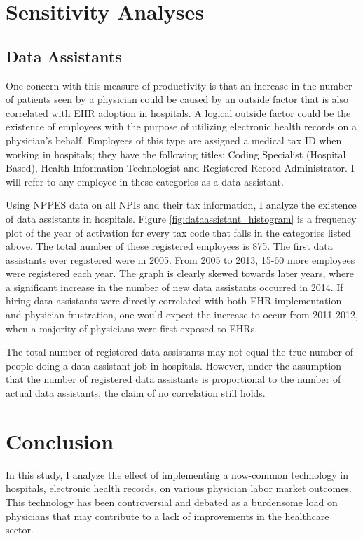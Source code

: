 \documentclass[11pt]{article}
\begin{document}
\section{Sensitivity Analyses}

\subsection{Data Assistants}

One concern with this measure of productivity is that an increase in the number of patients seen by a physician could be caused by an outside factor that is also correlated with EHR adoption in hospitals. A logical outside factor could be the existence of employees with the purpose of utilizing electronic health records on a physician's behalf. Employees of this type are assigned a medical tax ID when working in hospitals; they have the following titles: Coding Specialist (Hospital Based), Health Information Technologist and Registered Record Administrator. I will refer to any employee in these categories as a data assistant. 

Using NPPES data on all NPIs and their tax information, I analyze the existence of data assistants in hospitals. Figure \ref{fig:dataassistant_histogram} is a frequency plot of the year of activation for every tax code that falls in the categories listed above. The total number of these registered employees is 875. The first data assistants ever registered were in 2005. From 2005 to 2013, 15-60 more employees were registered each year. The graph is clearly skewed towards later years, where a significant increase in the number of new data assistants occurred in 2014. If hiring data assistants were directly correlated with both EHR implementation and physician frustration, one would expect the increase to occur from 2011-2012, when a majority of physicians were first exposed to EHRs. 


The total number of registered data assistants may not equal the true number of people doing a data assistant job in hospitals. However, under the assumption that the number of registered data assistants is proportional to the number of actual data assistants, the claim of no correlation still holds. 

\section{Conclusion}

In this study, I analyze the effect of implementing a now-common technology in hospitals, electronic health records, on various physician labor market outcomes. This technology has been controversial and debated as a burdensome load on physicians that may contribute to a lack of improvements in the healthcare sector. 
\end{document}
